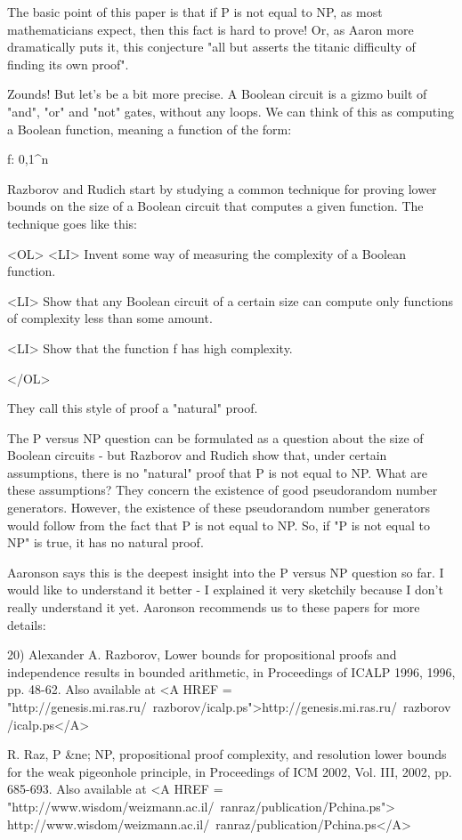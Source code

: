 The basic point of this paper is that if P is not equal to NP, as most
mathematicians expect, then this fact is hard to prove!  Or, as Aaron
more dramatically puts it, this conjecture "all but 
asserts the titanic difficulty of finding its own proof".

Zounds!  But let's be a bit more precise.  A Boolean circuit is a gizmo
built of "and", "or" and "not" gates, without any loops.  We can think 
of this as computing a Boolean function, meaning a function of the form:

f: {0,1}^{n}  

Razborov and Rudich start by studying a common technique for proving lower 
bounds on the size of a Boolean circuit that computes a given function.  
The technique goes like this:

<OL>
<LI>
  Invent some way of measuring the complexity of a Boolean function.

<LI>
 Show that any Boolean circuit of a certain size can compute only 
 functions of complexity less than some amount. 

<LI>
 Show that the function f has high complexity.

</OL>

They call this style of proof a "natural" proof.  

The P versus NP question can be formulated as a question about the size
of Boolean circuits - but Razborov and Rudich show that, under certain 
assumptions, there is no "natural" proof that P is not equal to NP.  
What are these assumptions?  They concern the existence of good 
pseudorandom number generators.  However, the existence of these 
pseudorandom number generators would follow from the fact that P 
is not equal to NP.  So, if "P is not equal to NP"
is true, it has no natural proof.  

Aaronson says this is the deepest insight into the P versus NP question
so far.  I would like to understand it better - I explained it very
sketchily because I don't really understand it yet.  Aaronson recommends 
us to these papers for more details:

20) Alexander 
A. Razborov, Lower bounds for propositional proofs and independence
results in bounded arithmetic, in Proceedings of ICALP 1996, 1996, pp. 48-62.
Also available at <A HREF = "http://genesis.mi.ras.ru/~razborov/icalp.ps">http://genesis.mi.ras.ru/~razborov/icalp.ps</A>

R. Raz, P &ne; NP, propositional proof complexity, and resolution
lower bounds for the weak pigeonhole principle, in Proceedings of ICM 2002,
Vol. III, 2002, pp. 685-693.  Also available at
<A HREF = "http://www.wisdom/weizmann.ac.il/~ranraz/publication/Pchina.ps">
http://www.wisdom/weizmann.ac.il/~ranraz/publication/Pchina.ps</A>

